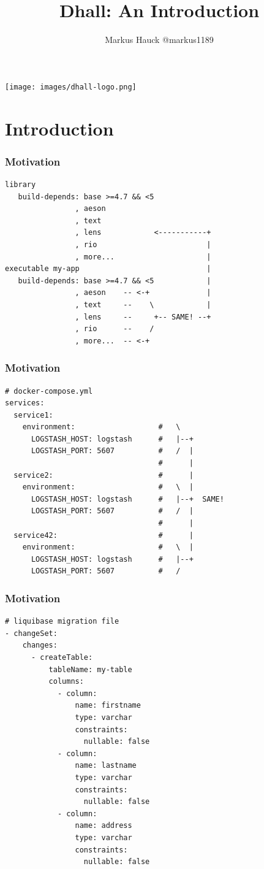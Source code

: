 \documentclass{beamer}
\title{Dhall: An Introduction}
\author{Markus Hauck @markus1189}
\begin{document}
\begin{frame}
  \begin{center}
    \texttt{[image: images/dhall-logo.png]}
  \end{center}
  \titlepage{}
\end{frame}

\section{Introduction}\label{sec:introduction}

\begin{frame}[fragile]
  \frametitle{Motivation}
  \begin{verbatim}
library
   build-depends: base >=4.7 && <5
                , aeson
                , text
                , lens            <-----------+
                , rio                         |
                , more...                     |
executable my-app                             |
   build-depends: base >=4.7 && <5            |
                , aeson    -- <-+             |
                , text     --    \            |
                , lens     --     +-- SAME! --+
                , rio      --    /
                , more...  -- <-+
  \end{verbatim}
\end{frame}

\begin{frame}[fragile]
  \frametitle{Motivation}
  \begin{verbatim}
# docker-compose.yml
services:
  service1:
    environment:                   #   \
      LOGSTASH_HOST: logstash      #   |--+
      LOGSTASH_PORT: 5607          #   /  |
                                   #      |
  service2:                        #      |
    environment:                   #   \  |
      LOGSTASH_HOST: logstash      #   |--+  SAME!
      LOGSTASH_PORT: 5607          #   /  |
                                   #      |
  service42:                       #      |
    environment:                   #   \  |
      LOGSTASH_HOST: logstash      #   |--+
      LOGSTASH_PORT: 5607          #   /
    \end{verbatim}
  \end{frame}

  \begin{frame}[fragile]
    \frametitle{Motivation}
    \begin{verbatim}
# liquibase migration file
- changeSet:
    changes:
      - createTable:
          tableName: my-table
          columns:
            - column:
                name: firstname
                type: varchar
                constraints:
                  nullable: false
            - column:
                name: lastname
                type: varchar
                constraints:
                  nullable: false
            - column:
                name: address
                type: varchar
                constraints:
                  nullable: false
    \end{verbatim}
  \end{frame}
\end{document}
